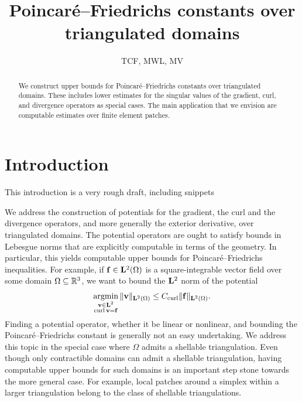 \documentclass[a4paper]{amsart}
\title{Poincar\'e--Friedrichs constants over triangulated domains}
\author{TCF, MWL, MV}
\begin{document}
\begin{abstract}
    We construct upper bounds for Poincar\'e--Friedrichs constants over triangulated domains. 
    These includes lower estimates for the singular values of the gradient, curl, and divergence operators as special cases. 
    The main application that we envision are computable estimates over finite element patches. 
\end{abstract}

\maketitle

\section{Introduction}\label{section:intro}

{\color{red}This introduction is a very rough draft, including snippets}

We address the construction of potentials for the gradient, the curl and the divergence operators, and more generally the exterior derivative, over triangulated domains. The potential operators are ought to satisfy bounds in Lebesgue norms that are explicitly computable in terms of the geometry. 
In particular, this yields computable upper bounds for Poincar\'e--Friedrichs inequalities. 
For example, if ${\mathbf f} \in {\mathbf L}^{2}(\Omega)$ is a square-integrable vector field over some domain $\Omega \subseteq {\mathbb R}^3$, 
we want to bound the ${\mathbf L}^2$ norm of the potential
\begin{align*}
    \operatorname*{{\rm argmin}}\limits_{ \substack{ {\mathbf v} \in {\mathbf L}^{2} \\ \operatorname{curl} {\mathbf v} = {\mathbf f} } } \| {\mathbf v} \|_{{\mathbf L}^{2}(\Omega)}
    \leq 
    C_{\operatorname{curl}}
    \| {\mathbf f} \|_{{\mathbf L}^{2}(\Omega)}
    .
\end{align*}
Finding a potential operator, whether it be linear or nonlinear, and bounding the Poincar\'e--Friedrichs constant is generally not an easy undertaking. 
We address this topic in the special case where $\Omega$ admits a shellable triangulation.
Even though only contractible domains can admit a shellable triangulation, 
having computable upper bounds for such domains is an important step stone towards the more general case. 
For example, local patches around a simplex within a larger triangulation belong to the class of shellable triangulations.
\end{document}
